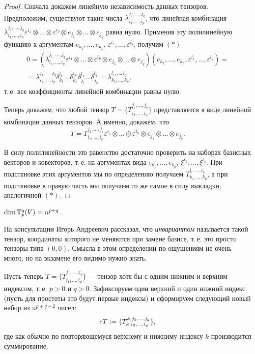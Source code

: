 \begin{proof}
    Сначала докажем линейную независимость данных тензоров. Предположим, существуют такие числа $\lambda_{i_1, \ldots, i_p}^{j_1, \ldots, j_q}$, что линейная комбинация $\lambda_{i_1, \ldots, i_p}^{j_1, \ldots, j_q}\varepsilon^{i_1} \otimes \ldots \otimes \varepsilon^{i_p} \otimes e_{j_1} \otimes \ldots \otimes e_{j_q}$ равна нулю. Применив эту полилинейную функцию к аргументам $e_{k_1}, \ldots, e_{k_p}$, $\varepsilon^{l_1}, \ldots, \varepsilon^{l_q}$, получим $(\ast)$
    \begin{multline*}
        0 = (\lambda_{i_1, \ldots, i_p}^{j_1, \ldots, j_q}\varepsilon^{i_1} \otimes \ldots \otimes \varepsilon^{i_p} \otimes e_{j_1} \otimes \ldots \otimes e_{j_q})(e_{k_1}, \ldots, e_{k_p}, \varepsilon^{l_1}, \ldots, \varepsilon^{l_q}) =\\ = \lambda_{i_1, \ldots, i_p}^{j_1, \ldots, j_q}\delta_{k_1}^{i_1}\ldots\delta_{k_p}^{i_p}\delta_{j_1}^{l_1}\ldots\delta_{j_q}^{l_q} = \lambda_{k_1, \ldots, k_p}^{l_1, \ldots, l_q},
    \end{multline*}
    т.\,е. все коэффициенты линейной комбинации равны нулю.

    Теперь докажем, что любой тензор $T = \{T_{i_1, \ldots, i_p}^{j_1, \ldots, j_q}\}$ представляется в виде линейной комбинации данных тензоров. А именно, докажем, что
    \[
        T = T_{i_1, \ldots, i_p}^{j_1, \ldots, j_q}\varepsilon^{i_1} \otimes \ldots \otimes \varepsilon^{i_p} \otimes e_{j_1} \otimes \ldots \otimes e_{j_q}.
    \]

    В силу полилинейности это равенство достаточно проверить на наборах базисных векторов и ковекторов, т.\,е. на аргументах вида $e_{k_1}, \ldots, e_{k_p}$, $\xi^{l_1}, \ldots, \xi^{l_q}$. При подстановке этих аргументов мы по определению получаем $T_{k_1, \ldots, k_p}^{l_1, \ldots, l_q}$, а при подстановке в правую часть мы получаем то же самое в силу выкладки, аналогичной $(\ast)$.
\end{proof}

\begin{corollary}
    $\dim\mathbb{T}_p^q(V) = n^{p + q}$.
\end{corollary}

На консультации Игорь Андреевич рассказал, что \textit{инвариантом} называется такой тензор, координаты которого не меняются при замене базисе, т.\,е. это просто тензоры типа $(0, 0)$. Смысла в этом определении по ощущениям не очень много, но на экзамене его видимо нужно знать.

Пусть теперь $T = \{T_{i_1, \ldots, i_p}^{j_1, \ldots, j_q}\}$ --- тензор хотя бы с одним нижним и верхним индексом, т.\,е. $p > 0$ и $q > 0$. Зафиксируем один верхний и один нижний индекс (пусть для простоты это будут первые индексы) и сформируем следующий новый набор из $n^{p + q - 2}$ чисел:
\[
    cT \vcentcolon = \{T_{k, i_2, \ldots, i_p}^{k, j_2, \ldots, j_q}\},
\]
где как обычно по повторяющемуся верхнему и нижниму индексу $k$ производится суммирование. 

